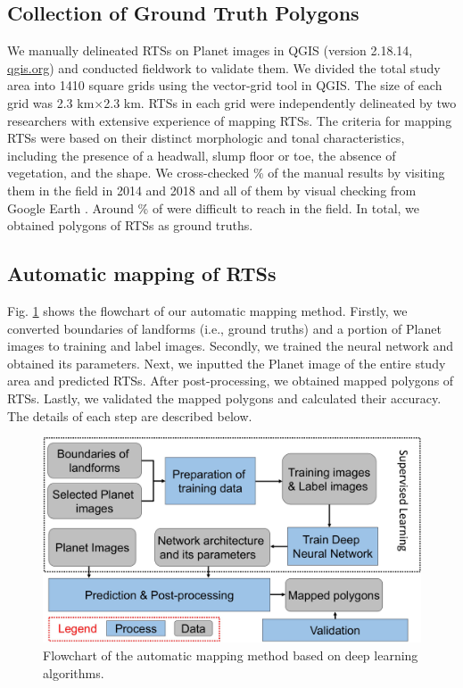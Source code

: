 \documentclass[authoryear,preprint,review,12pt]{elsarticle}
\begin{document}
\subsection{Collection of Ground Truth Polygons}
\label{subsec_collect_groundtruth}

We manually delineated RTSs  on Planet images in QGIS (version 2.18.14, \url{qgis.org}) and conducted fieldwork to validate them. We divided the total study area into 1410 square grids using the vector-grid tool in QGIS. The size of each grid was 2.3 km$\times$2.3 km. RTSs in each grid were independently delineated by two researchers with extensive experience of mapping RTSs. 
The criteria for mapping RTSs were based on their distinct morphologic and tonal characteristics, including the presence of a headwall, slump floor or toe, the absence of vegetation, and the  shape. We cross-checked \% of the manual results by visiting them in the field in 2014 and 2018 and all of them by visual checking  from Google Earth . Around \% of  were difficult to reach in the field. In total, we obtained  polygons of RTSs as ground truths.  

\subsection{Automatic mapping of RTSs}
\label{subsec_auto_mapping}

Fig. \ref{fig_flowchart} shows the flowchart of our automatic mapping method. Firstly, we converted boundaries of landforms (i.e., ground truths) and a portion of Planet images to training and label images. Secondly, we trained the neural network and obtained its parameters. Next, we inputted the Planet image of the entire study area and predicted RTSs. After post-processing, we obtained mapped polygons of RTSs. Lastly, we validated the mapped polygons and calculated their accuracy. The details of each step are described below.

\begin{figure}[ht]
	\centering
	\includegraphics[width=12cm]{figures/flowchart_trim.jpg}
	\caption{Flowchart of the automatic mapping method based on deep learning algorithms.}
	\label{fig_flowchart}
\end{figure}
\end{document}
